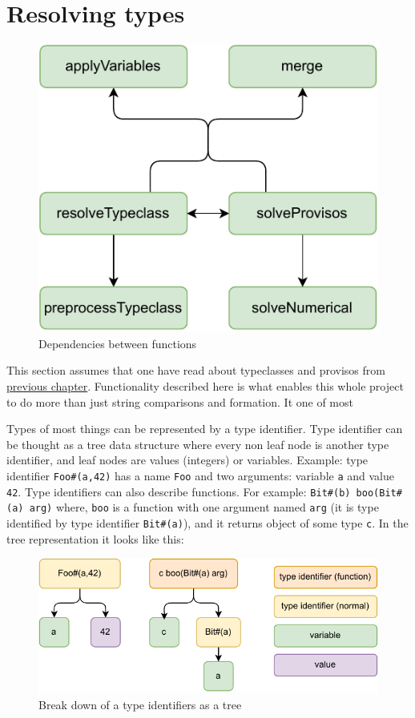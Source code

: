 \documentclass[12pt]{report}
\begin{document}
\section{Resolving types}
\begin{figure}[!h]
    \centering
    \caption{Dependencies between functions}

    \includegraphics[width=0.5\columnwidth]{pdfExports/LargeMapResolve.pdf}
\end{figure}
This section assumes that one have read about typeclasses and provisos from \hyperref[sec:Typeclasses]{previous chapter}.
Functionality described here is what enables this whole project to do more than just string comparisons and formation. It one of most 
\par
Types of most things can be represented by a type identifier.
Type identifier can be thought as a tree data structure where every non leaf node is another type identifier, and leaf nodes are values (integers) or variables. 
Example: type identifier \verb!Foo#(a,42)! has a name \verb!Foo! and two arguments: variable \verb!a! and value \verb!42!.
Type identifiers can also describe functions.
For example: \verb!Bit#(b) boo(Bit#(a) arg)! where, 
\verb!boo! is a function with one argument named \verb!arg! (it is type identified by type identifier \verb!Bit#(a)!), and it returns object of some type \verb!c!. In the tree representation it looks like this:
\begin{figure}[h]
    \centering
    \caption{Break down of a type identifiers as a tree}
    \includegraphics[width=0.7\columnwidth]{pdfExports/LargeMap-FunctionBreakDown.drawio.pdf}
\end{figure}
\end{document}
